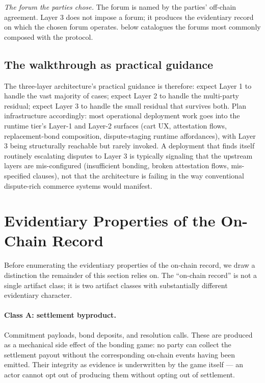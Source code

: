 \documentclass[11pt,a4paper]{article}
\theoremstyle{remark}
\begin{document}
\emph{The forum the parties chose.} The forum is named by the
parties' off-chain agreement. Layer 3 does not impose a forum;
it produces the evidentiary record on which the chosen forum
operates.  below catalogues the
forums most commonly composed with the protocol.

\subsection{The walkthrough as practical guidance}

The three-layer architecture's practical guidance is therefore:
expect Layer 1 to handle the vast majority of cases; expect
Layer 2 to handle the multi-party residual; expect Layer 3 to
handle the small residual that survives both. Plan
infrastructure accordingly: most operational deployment work goes
into the runtime tier's Layer-1 and Layer-2 surfaces (cart UX,
attestation flows, replacement-bond composition, dispute-staging
runtime affordances), with Layer 3 being structurally reachable
but rarely invoked. A deployment that finds itself routinely
escalating disputes to Layer 3 is typically signaling that the
upstream layers are mis-configured (insufficient bonding, broken
attestation flows, mis-specified clauses), not that the
architecture is failing in the way conventional dispute-rich
commerce systems would manifest.

\section{Evidentiary Properties of the On-Chain Record}
\label{sec:evidentiary}

Before enumerating the evidentiary properties of the on-chain
record, we draw a distinction the remainder of this section
relies on. The ``on-chain record'' is not a single artifact
class; it is two artifact classes with substantially different
evidentiary character.

\paragraph{Class A: settlement byproduct.}
Commitment payloads, bond deposits, and resolution calls. These
are produced as a mechanical side effect of the bonding game: no
party can collect the settlement payout without the corresponding
on-chain events having been emitted. Their integrity as evidence
is underwritten by the game itself --- an actor cannot opt out of
producing them without opting out of settlement.
\end{document}
